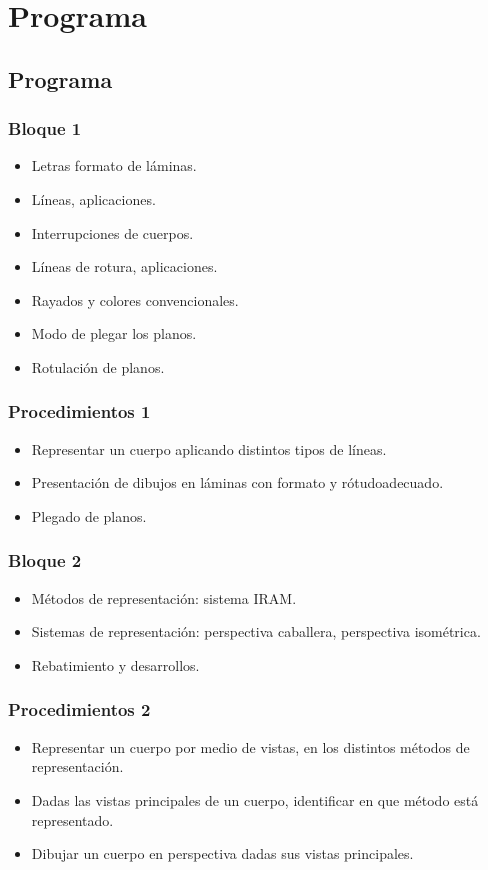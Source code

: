 \documentclass[../main]{subfiles}
\begin{document}
\chapter*{Programa}
\section{Programa}
\subsection{Bloque 1}
\begin{itemize}
    \item Letras formato de láminas.
    \item Líneas, aplicaciones.
    \item Interrupciones de cuerpos.
    \item Líneas de rotura, aplicaciones.
    \item Rayados y colores convencionales.
    \item Modo de plegar los planos.
    \item Rotulación de planos.
\end{itemize}
\subsection{Procedimientos 1}
\begin{itemize}
    \item Representar un cuerpo aplicando distintos tipos de líneas.
    \item Presentación de dibujos en láminas con formato y rótudoadecuado.
    \item Plegado de planos.
\end{itemize}
\subsection{Bloque 2}
\begin{itemize}
    \item Métodos de representación: sistema IRAM.
    \item Sistemas de representación: perspectiva caballera, perspectiva isométrica.
    \item Rebatimiento y desarrollos.
\end{itemize}
\subsection{Procedimientos 2}
\begin{itemize}
    \item Representar un cuerpo por medio de vistas, en los distintos métodos de representación.
    \item Dadas las vistas principales de un cuerpo, identificar en que método está representado.
    \item Dibujar un cuerpo en perspectiva dadas sus vistas principales.
\end{itemize}
\end{document}
